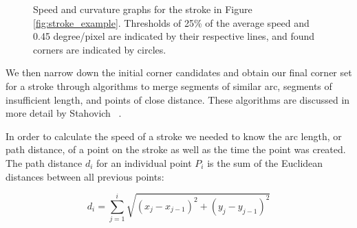 \documentclass[10pt]{acmsiggraph}          %
\begin{document}
\begin{figure}[t]
  \centering
  \caption{Speed and curvature graphs for the stroke in Figure \ref{fig:stroke_example}. Thresholds of 25\% of the average speed and 0.45 degree/pixel are indicated by their respective lines, and found corners are indicated by circles.}
  \label{fig:unfiltered}
\end{figure}


We then narrow down the initial corner candidates and obtain our final corner set for a stroke through algorithms to merge segments of similar arc, segments of insufficient 
length, and points of close distance. These algorithms are discussed in more detail by Stahovich ~.

In order to calculate the speed of a stroke we needed to know the arc length, or path distance, of a point on the stroke as well as the time the point was created. The path distance $d_i$ for an individual point $P_i$ is the sum of the Euclidean distances between all previous points:

\begin{equation}
d_i = \sum^{i}_{j=1} \sqrt{(x_j - x_{j-1})^2 + (y_j - y_{j-1})^2}
\end{equation}
\end{document}
